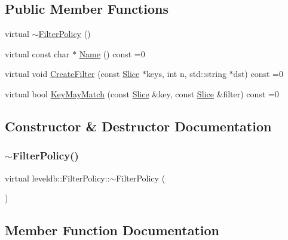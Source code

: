 \subsection*{Public Member Functions}
\begin{DoxyCompactItemize}
\item 
virtual \mbox{\hyperlink{classleveldb_1_1_filter_policy_a17427f3887bf1964827fe7bece003aa6}{$\sim$\+Filter\+Policy}} ()
\item 
virtual const char $\ast$ \mbox{\hyperlink{classleveldb_1_1_filter_policy_afd5e951892a2e740f186c0658913ea1b}{Name}} () const =0
\item 
virtual void \mbox{\hyperlink{classleveldb_1_1_filter_policy_a355e9797e16dd16b93d19056781126b2}{Create\+Filter}} (const \mbox{\hyperlink{classleveldb_1_1_slice}{Slice}} $\ast$keys, int n, std\+::string $\ast$dst) const =0
\item 
virtual bool \mbox{\hyperlink{classleveldb_1_1_filter_policy_a6f8ba10ea25e0b4b8d0a6607c361c718}{Key\+May\+Match}} (const \mbox{\hyperlink{classleveldb_1_1_slice}{Slice}} \&key, const \mbox{\hyperlink{classleveldb_1_1_slice}{Slice}} \&filter) const =0
\end{DoxyCompactItemize}


\subsection{Constructor \& Destructor Documentation}
\mbox{\label{classleveldb_1_1_filter_policy_a17427f3887bf1964827fe7bece003aa6}} 
\subsubsection{\texorpdfstring{$\sim$FilterPolicy()}{~FilterPolicy()}}
{\footnotesize\ttfamily virtual leveldb\+::\+Filter\+Policy\+::$\sim$\+Filter\+Policy (\begin{DoxyParamCaption}{ }\end{DoxyParamCaption})\hspace{0.3cm}{\ttfamily [virtual]}}



\subsection{Member Function Documentation}
\mbox{\label{classleveldb_1_1_filter_policy_a355e9797e16dd16b93d19056781126b2}} 
